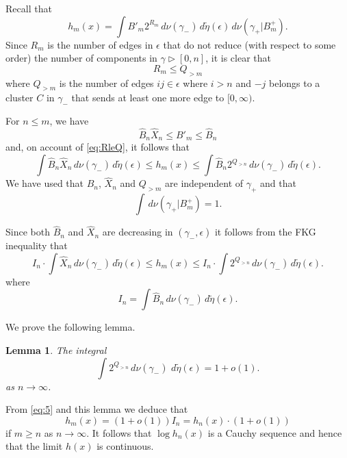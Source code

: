 \documentclass[11pt, a4paper]{amsart}
\newtheorem{lemma}[thm]{Lemma}
\theoremstyle{definition}
\theoremstyle{remark}
\renewcommand{\d}{\,d}
\providecommand{\e}{\epsilon}
\providecommand{\tl}{\tilde}
\providecommand{\g}{\gamma}
\begin{document}
 \newline

\noindent
Recall that
\begin{equation}\label{eq:3}
  h_m(x) =  \int B'_m 2^{R_m} \d \nu(\g_-)\d\tl\eta(\e) \d \nu(\g_+|B_m^+).
\end{equation}
Since $R_m$ is the number of edges in $\e$ that do not reduce (with respect to
some order) the number of components in $\g\triangleright [0,n]$, it is clear
that
\begin{equation}\label{eq:RleQ}
  R_m \le Q_{>m}
\end{equation}
where \(Q_{>m}\) is the number of edges $ij\in\e$ where $i>n$ and $-j$ belongs
to a cluster $C$ in $\g_-$ that sends at least one more edge to $[0,\infty)$.

For $n\le m$, we have
$$ \hat B_n \hat X_n \le B'_m \le \hat B_n $$
and, on account of \eqref{eq:RleQ}, it follows that
\begin{equation}\label{eq:4}
  \int \hat B_n \hat X_n \d \nu(\g_-) \d\tl\eta(\e)
  \le h_m(x) \le \int \hat B_n 2^{Q_{>n}} \d\nu(\g_-) \d\tl\eta(\e).
\end{equation}
We have used that $\hat B_n$, $\hat X_n$ and $Q_{>m}$ are independent of $\g_+$
and that
$$\int\d\nu(\g_+|B_m^+)=1. $$

Since both $\hat B_n$ and $\hat X_n$ are decreasing in $(\g_-,\e)$ it follows
from the FKG inequality that
\begin{equation}
  \label{eq:5}
  I_n \cdot \int \hat X_n \d\nu(\g_-) \d\tl\eta(\e)
  \le h_m(x)
  \le I_n \cdot \int 2^{Q_{>n}} \d\nu(\g_-) \d\tl\eta(\e).
\end{equation}
where
\begin{equation}
  \label{eq:6}
  I_n = \int \hat B_n \d\nu(\g_-) \d\tl\eta(\e).
\end{equation}

We prove the following lemma.
\begin{lemma}\label{lem:qn}
  The integral
  \[
    \int 2^{Q_{>n}} \d\nu(\g_-)\, \d\tilde\eta(\e) = 1+o(1).
  \]
  as $n\to\infty$.
\end{lemma}

From \eqref{eq:5} and this lemma we deduce that
\begin{equation}
  \label{eq:2}
  h_m(x) = (1+o(1)) I_n = h_n(x) \cdot (1+o(1))
\end{equation}
if $m\ge n$ as $n\to\infty$. It follows that $\log h_n(x)$ is a Cauchy sequence
and hence that the limit $h(x)$ is continuous.
\end{document}
